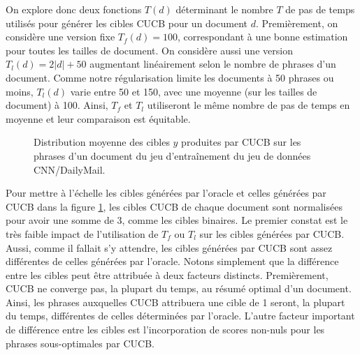 On explore donc deux fonctions $T(d)$ déterminant le 
nombre $T$ de pas de temps utilisés pour 
générer les cibles CUCB pour un document $d$.
Premièrement, on considère une version fixe $T_f(d)=100$, correspondant à une 
bonne estimation pour toutes les tailles de document.
On considère aussi une version $T_l(d)=2|d| + 50$ augmentant linéairement selon 
le nombre de phrases d'un document.
Comme notre régularisation limite les documents à 50 phrases ou moins, 
$T_l(d)$ varie entre 50 et 150, avec une moyenne (sur les tailles de document) à 
100.
Ainsi, $T_f$ et $T_l$ utiliseront le même nombre de pas de temps en moyenne 
et leur comparaison est équitable.

\begin{figure}[ht!]
  \centering
  \caption[Distribution moyenne des cibles CUCB sur les phrases d'un document]
  {Distribution moyenne des cibles $y$ produites par CUCB sur les phrases 
  d'un document du jeu d'entraînement du jeu de données CNN/DailyMail.}
  \label{fig:distro_cibles_cucb}
\end{figure}

Pour mettre à l'échelle les cibles générées par l'oracle 
et celles générées par CUCB dans la figure \ref{fig:distro_cibles_cucb},
les cibles CUCB de chaque document sont normalisées pour 
avoir une somme de 3, comme les cibles binaires.
Le premier constat est le très faible impact de l'utilisation de $T_f$ 
ou $T_l$ sur les cibles générées par CUCB.
Aussi, comme il fallait s'y attendre, les cibles générées par CUCB sont assez différentes 
de celles générées par l'oracle.
Notons simplement que la différence entre les cibles peut être attribuée 
à deux facteurs distincts.
Premièrement, CUCB ne converge pas, la plupart du temps, au résumé optimal 
d'un document.
Ainsi, les phrases auxquelles CUCB attribuera une cible de 1 seront,
la plupart du temps, différentes de celles déterminées par l'oracle.
L'autre facteur important de différence entre les cibles est 
l'incorporation de scores non-nuls pour les phrases sous-optimales par CUCB.

